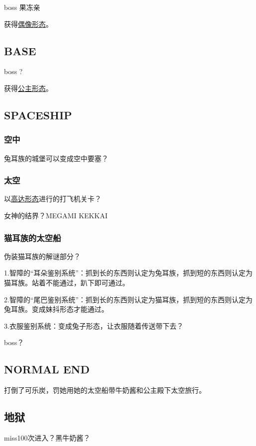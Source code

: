 \documentclass{article}
\begin{document}
boss 果冻亲

获得\hyperref[costume_idol]{偶像形态}。



\subsection{BASE}

boss ?

获得\hyperref[costume_hime]{公主形态}。

\subsection{SPACESHIP}

\subsubsection{空中}

兔耳族的城堡可以变成空中要塞？

\subsubsection{太空}
以\hyperref[costume_gundam]{高达形态}进行的打飞机关卡？

女神的结界？MEGAMI KEKKAI

\subsubsection{猫耳族的太空船}

伪装猫耳族的解谜部分？

1.智障的“耳朵鉴别系统”：抓到长的东西则认定为兔耳族，抓到短的东西则认定为猫耳族。站着不能通过，趴下即可通过。

2.智障的“尾巴鉴别系统”：抓到长的东西则认定为猫耳族，抓到短的东西则认定为兔耳族。变成妹抖形态才能通过。

3.衣服鉴别系统：变成兔子形态，让衣服随着传送带下去？

boss？

\subsection{NORMAL END}

打倒了可乐炭，罚她用她的太空船带牛奶酱和公主殿下太空旅行。

\subsection{地狱}

miss100次进入？黑牛奶酱？
\end{document}
